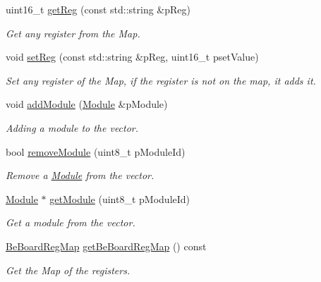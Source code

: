 \begin{CompactItemize}
uint16\_\-t \hyperlink{class_ph2___hw_description_1_1_be_board_e28c81e80dab7acdd5fa90819709f339}{get\-Reg} (const std::string \&p\-Reg)
\begin{CompactList}\small\item\em Get any register from the Map. \item\end{CompactList}\item 
void \hyperlink{class_ph2___hw_description_1_1_be_board_84cf502132f9391e0ac7c53d230c3ea0}{set\-Reg} (const std::string \&p\-Reg, uint16\_\-t pset\-Value)
\begin{CompactList}\small\item\em Set any register of the Map, if the register is not on the map, it adds it. \item\end{CompactList}\item 
void \hyperlink{class_ph2___hw_description_1_1_be_board_5242925c065165be9b407dabf889ac9a}{add\-Module} (\hyperlink{class_ph2___hw_description_1_1_module}{Module} \&p\-Module)
\begin{CompactList}\small\item\em Adding a module to the vector. \item\end{CompactList}\item 
bool \hyperlink{class_ph2___hw_description_1_1_be_board_ba02e7319c8c41b569c583bfa2068215}{remove\-Module} (uint8\_\-t p\-Module\-Id)
\begin{CompactList}\small\item\em Remove a \hyperlink{class_ph2___hw_description_1_1_module}{Module} from the vector. \item\end{CompactList}\item 
\hyperlink{class_ph2___hw_description_1_1_module}{Module} $\ast$ \hyperlink{class_ph2___hw_description_1_1_be_board_71b8e3e970d554d7642bea8a9d21b037}{get\-Module} (uint8\_\-t p\-Module\-Id)
\begin{CompactList}\small\item\em Get a module from the vector. \item\end{CompactList}\item 
\hyperlink{namespace_ph2___hw_description_2e13fb82c8ed98154c60f9d0f8467d72}{Be\-Board\-Reg\-Map} \hyperlink{class_ph2___hw_description_1_1_be_board_d7a7bbe35ca9558c89c6fd349532fd0d}{get\-Be\-Board\-Reg\-Map} () const 
\begin{CompactList}\small\item\em Get the Map of the registers. \item\end{CompactList}\item 

\end{CompactItemize}
